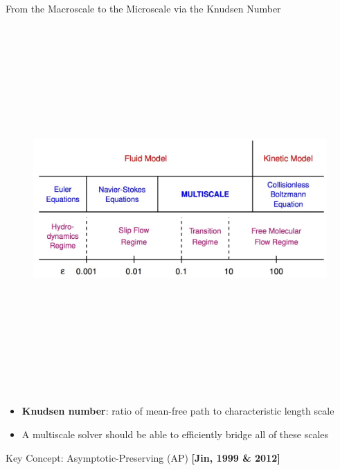 \documentclass[final,hyperref={pdfpagelabels=false}]{beamer}
\begin{document}
\begin{frame}[t]
\begin{columns}[t]
\begin{column}{.31\textwidth}
\begin{block}{From the Macroscale to the Microscale via the Knudsen Number}
\begin{figure}
\begin{center}
   \includegraphics[height=140mm]{knudsen.jpg}
   \end{center}
\end{figure}

\vspace{-4mm}

\begin{itemize}

\item {\bf Knudsen number}: ratio of mean-free path to characteristic length scale

\item A multiscale solver should be able to efficiently bridge all of these scales 

\end{itemize}
     
\end{block}

\begin{block}{Key Concept: Asymptotic-Preserving (AP) {\bf [Jin, 1999 \& 2012]}
}


\end{block}
\end{column}
\end{columns}
\end{frame}
\end{document}
